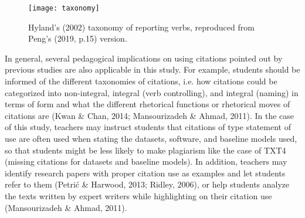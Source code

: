 \begin{figure}[htb]
    \centering
    \texttt{[image: taxonomy]}
    \caption[Hyland’s (2002) taxonomy of reporting verbs]{Hyland’s (2002) taxonomy of reporting verbs, reproduced from Peng’s (2019,  p.15) version.}
    \label{fig:taxonomy}
  \end{figure}

In general, several pedagogical implications on using citations pointed out by previous studies are also applicable in this study. For example, students should be informed of the different taxonomies of citations, i.e. how citations could be categorized into non-integral, integral (verb controlling), and integral (naming) in terms of form and what the different rhetorical functions or rhetorical moves of citations are (Kwan \& Chan, 2014; Mansourizadeh \& Ahmad, 2011). In the case of this study, teachers may instruct students that citations of type statement of use are often used when stating the datasets, software, and baseline models used, so that students might be less likely to make plagiarism like the case of TXT4 (missing citations for datasets and baseline models). In addition, teachers may identify research papers with proper citation use as examples and let students refer to them (Petrić \& Harwood, 2013; Ridley, 2006), or help students analyze the texts written by expert writers while highlighting on their citation use (Mansourizadeh \& Ahmad, 2011).